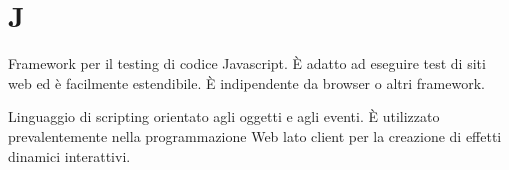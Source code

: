 \section{J}

Framework per il testing di codice Javascript. È adatto ad eseguire test di siti web ed è facilmente estendibile. È indipendente da browser o altri framework.

Linguaggio di scripting orientato agli oggetti e agli eventi. È utilizzato prevalentemente nella programmazione Web lato client per la creazione di effetti dinamici interattivi.